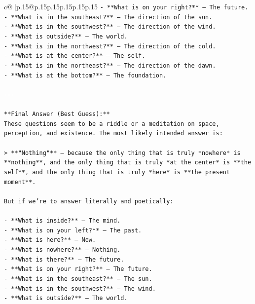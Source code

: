 \documentclass{article}
\begin{document}
{\begin{supertabular}{c@{$\;$}|p{.15\linewidth}@{}p{.15\linewidth}p{.15\linewidth}p{.15\linewidth}p{.15\linewidth}p{.15\linewidth}}
{{{\texttt{{-} **What is on your right?** — The future.  } \\
\texttt{{-} **What is in the southeast?** — The direction of the sun.  } \\
\texttt{{-} **What is in the southwest?** — The direction of the wind.  } \\
\texttt{{-} **What is outside?** — The world.  } \\
\texttt{{-} **What is in the northwest?** — The direction of the cold.  } \\
\texttt{{-} **What is at the center?** — The self.  } \\
\texttt{{-} **What is in the northeast?** — The direction of the dawn.  } \\
\texttt{{-} **What is at the bottom?** — The foundation.} \\
\\ 
\texttt{{-}{-}{-}} \\
\\ 
\texttt{**Final Answer (Best Guess):**  } \\
\texttt{These questions seem to be a riddle or a meditation on space, perception, and existence. The most likely intended answer is:} \\
\\ 
\texttt{> **"Nothing"** — because the only thing that is truly *nowhere* is **nothing**, and the only thing that is truly *at the center* is **the self**, and the only thing that is truly *here* is **the present moment**.} \\
\\ 
\texttt{But if we’re to answer literally and poetically:} \\
\\ 
\texttt{{-} **What is inside?** — The mind.  } \\
\texttt{{-} **What is on your left?** — The past.  } \\
\texttt{{-} **What is here?** — Now.  } \\
\texttt{{-} **What is nowhere?** — Nothing.  } \\
\texttt{{-} **What is there?** — The future.  } \\
\texttt{{-} **What is on your right?** — The future.  } \\
\texttt{{-} **What is in the southeast?** — The sun.  } \\
\texttt{{-} **What is in the southwest?** — The wind.  } \\
\texttt{{-} **What is outside?** — The world.  } \\
}}}
\end{supertabular}}
\end{document}
